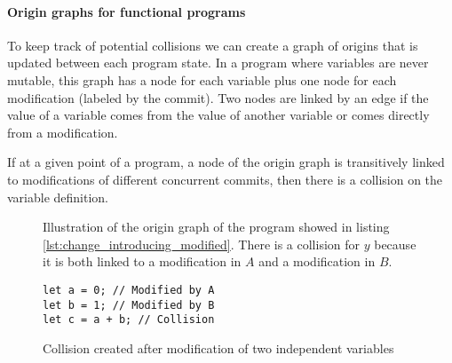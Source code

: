 \documentclass[a4paper,10pt]{article}
\begin{document}
\paragraph{Origin graphs for functional programs} To keep track of potential collisions we can create a graph of origins that is updated between each program state. In a program where variables are never mutable, this graph has a node for each variable plus one node for each modification (labeled by the commit). Two nodes are linked by an edge if the value of a variable comes from the value of another variable or comes directly from a modification.

If at a given point of a program, a node of the origin graph is transitively linked to modifications of different concurrent commits, then there is a collision on the variable definition.

\begin{figure}[ht]
\centering{}
\caption{Illustration of the origin graph of the program showed in listing \ref{lst:change_introducing_modified}. There is a collision for $y$ because it is both linked to a modification in $A$ and a modification in $B$.}
\label{fig:change_introducing_modified}
\end{figure}

\begin{figure}[ht]
\begin{minipage}{.5\textwidth}
\begin{lstlisting}
let a = 0; // Modified by A
let b = 1; // Modified by B
let c = a + b; // Collision
\end{lstlisting}
\end{minipage}\hfill
\begin{minipage}{.45\textwidth}
\centering{}
\end{minipage}
\caption{Collision created after modification of two independent variables}
\end{figure}
\FloatBarrier
\end{document}
